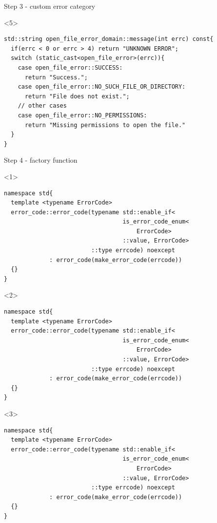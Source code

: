\documentclass[10pt]{beamer}
\begin{document}
\begin{frame}[fragile]{Step 3 - custom error category}
	\begin{onlyenv}
	\begin{verbatim}
std::string open_file_error_domain::message(int errc) const{
  if(errc < 0 or errc > 4) return "UNKNOWN ERROR";
  switch (static_cast<open_file_error>(errc)){
    case open_file_error::SUCCESS:
      return "Success.";
    case open_file_error::NO_SUCH_FILE_OR_DIRECTORY:
      return "File does not exist.";
    // other cases
    case open_file_error::NO_PERMISSIONS:
      return "Missing permissions to open the file."
  }
}
\end{verbatim}
	\end{onlyenv}
\end{frame}

\begin{frame}[fragile]{Step 4 - factory function}
	\begin{onlyenv}
	\begin{verbatim}
namespace std{
  template <typename ErrorCode>
  error_code::error_code(typename std::enable_if<
                                  is_error_code_enum<
                                      ErrorCode>
                                  ::value, ErrorCode>
                         ::type errcode) noexcept 
             : error_code(make_error_code(errcode))
  {}
}
	\end{verbatim}
	\end{onlyenv}

	\begin{onlyenv}
	\begin{verbatim}
namespace std{
  template <typename ErrorCode>
  error_code::error_code(typename std::enable_if<
                                  is_error_code_enum<
                                      ErrorCode>
                                  ::value, ErrorCode>
                         ::type errcode) noexcept 
             : error_code(make_error_code(errcode))
  {}
}
	\end{verbatim}
	\end{onlyenv}
	
	\begin{onlyenv}
	\begin{verbatim}
namespace std{
  template <typename ErrorCode>
  error_code::error_code(typename std::enable_if<
                                  is_error_code_enum<
                                      ErrorCode>
                                  ::value, ErrorCode>
                         ::type errcode) noexcept 
             : error_code(make_error_code(errcode))
  {}
}
	\end{verbatim}
	\end{onlyenv}

\end{frame}
\end{document}

